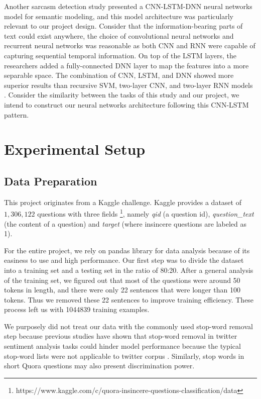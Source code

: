 \documentclass[12pt]{diazessay} %
\begin{document}
Another sarcasm detection study \citep{ghosh2016} presented a CNN-LSTM-DNN neural networks model for semantic modeling, and this model architecture was particularly relevant to our project design. Consider that the information-bearing parts of text could exist anywhere, the choice of convolutional neural networks and recurrent neural networks was reasonable as both CNN and RNN were capable of capturing sequential temporal information. On top of the LSTM layers, the researchers added a fully-connected DNN layer to map the features into a more separable space. The combination of CNN, LSTM, and DNN showed more superior results than recursive SVM, two-layer CNN, and two-layer RNN models \citep{ghosh2016}. Consider the similarity between the tasks of this study and our project, we intend to construct our neural networks architecture following this CNN-LSTM pattern. 

\section{Experimental Setup}

\subsection{Data Preparation} \label{data}
This project originates from a Kaggle challenge. Kaggle provides a dataset of $1,306,122$ questions with three fields \footnote{https://www.kaggle.com/c/quora-insincere-questions-classification/data}, namely \textit{qid} (a question id), \textit{question\_text} (the content of a question) and \textit{target} (where insincere questions are labeled as 1). 

For the entire project, we rely on pandas library for data analysis because of its easiness to use and high performance. Our first step was to divide the dataset into a training set and a testing set in the ratio of 80:20. After a general analysis of the training set, we figured out that most of the questions were around 50 tokens in length, and there were only 22 sentences that were longer than 100 tokens. Thus we removed these 22 sentences to improve training efficiency. These process left us with \num[group-separator={,}]{1044839} training examples. 

We purposely did not treat our data with the commonly used stop-word removal step because previous studies have shown that stop-word removal in twitter sentiment analysis tasks could hinder model performance because the typical stop-word lists were not applicable to twitter corpus \citep{giachanou2016}. Similarly, stop words in short Quora questions may also present discrimination power. 
\end{document}
